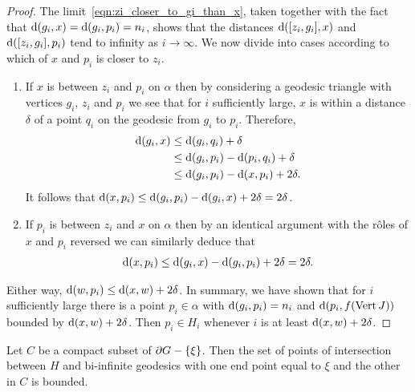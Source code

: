 \documentclass[a4paper]{article}
\begin{document}
\begin{proof}
  The limit~\eqref{eqn:zi_closer_to_gi_than_x}, taken together with the fact
  that $\operatorname{d}(g_i, x) = \operatorname{d}(g_i, p_i) = n_i$, shows that the distances
  $\operatorname{d}([z_i, g_i], x)$ and $\operatorname{d}([z_i, g_i], p_i)$ tend to infinity as
  $i\to\infty$.  We now divide into cases according to which of $x$ and $p_i$
  is closer to $z_i$.
  \begin{enumerate}
    \item If $x$ is between $z_i$ and $p_i$ on $\alpha$ then by considering a
      geodesic triangle with vertices $g_i$, $z_i$ and $p_i$ we see that for
      $i$ sufficiently large, $x$ is within a distance $\delta$ of a point
      $q_i$ on the geodesic from $g_i$ to $p_i$.  Therefore,
      \begin{align*}
        \operatorname{d}(g_i,x)&\leq \operatorname{d}(g_i,q_i)+\delta\\
                        &\leq \operatorname{d}(g_i,p_i)-\operatorname{d}(p_i,q_i)+\delta\\
                        &\leq \operatorname{d}(g_i,p_i)-\operatorname{d}(x,p_i)+2\delta.
      \end{align*}
      It follows that $\operatorname{d}(x,p_i) \leq \operatorname{d}(g_i,p_i)-\operatorname{d}(g_i,x)+2\delta
      = 2\delta$.
    \item If $p_i$ is between $z_i$ and $x$ on $\alpha$ then by an identical 
      argument with the r\^oles of $x$ and $p_i$ reversed we can similarly 
      deduce that 
      \begin{align*}
        \operatorname{d}(x,p_i)\leq\operatorname{d}(g_i,x) - \operatorname{d}(g_i,p_i) + 2\delta =2\delta.
      \end{align*}
  \end{enumerate}

  Either way, $\operatorname{d}(w, p_i) \leq \operatorname{d}(x,w) + 2\delta$. In summary, we have
  shown that for $i$ sufficiently large there is a point $p_i\in\alpha$ with
  $\operatorname{d}(g_i,p_i)=n_i$ and $\operatorname{d}(p_i,f(\operatorname{Vert} J))$ bounded by $\operatorname{d}(x,w) +
  2\delta$. Then $p_i \in H_i$ whenever $i$ is at least $\operatorname{d}(x,w) + 2\delta$.
\end{proof}

\begin{lemma}\label{lem:boundedintersection}
  Let $C$ be a compact subset of $\partial G - \left\{\xi\right\}$. Then the set of points 
  of intersection between $H$ and bi-infinite geodesics with one end point equal 
  to $\xi$ and the other in $C$ is bounded.
\end{lemma}
\end{document}
